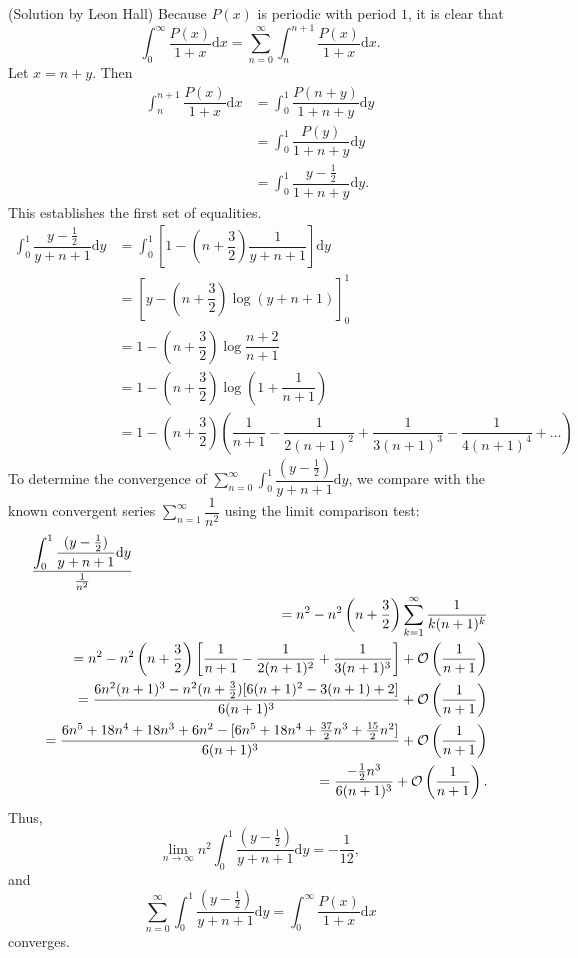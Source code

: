 \begin{solution}
(Solution by Leon Hall)
Because $P(x)$ is periodic with period $1$, it is clear that
$$\displaystyle\int_0^{\infty} \dfrac{P(x)}{1+x} \mathrm{d}x = \displaystyle\sum_{n=0}^{\infty} \displaystyle\int_n^{n+1} \dfrac{P(x)}{1+x} \mathrm{d}x.$$
Let $x = n+y$. Then
$$\begin{array}{ll}
\displaystyle\int_n^{n+1} \dfrac{P(x)}{1+x} \mathrm{d}x &= \displaystyle\int_0^1 \dfrac{P(n+y)}{1+n+y} \mathrm{d}y \\
&= \displaystyle\int_0^1 \dfrac{P(y)}{1+n+y}\mathrm{d}y \\
&= \displaystyle\int_0^1 \dfrac{y - \frac{1}{2}}{1+n+y} \mathrm{d}y.
\end{array}$$
This establishes the first set of equalities. 
$$\begin{array}{ll}
\displaystyle\int_0^1 \dfrac{y - \frac{1}{2}}{y+n+1} \mathrm{d}y &= \displaystyle\int_0^1 \left[ 1 - \left( n + \dfrac{3}{2} \right) \dfrac{1}{y+n+1} \right] \mathrm{d}y \\
&= \left[ y - \left( n + \dfrac{3}{2} \right) \log(y+n+1) \right]_0^1 \\
&= 1 - \left( n + \dfrac{3}{2} \right) \log \dfrac{n+2}{n+1} \\
&= 1 - \left( n + \dfrac{3}{2} \right) \log \left( 1 + \dfrac{1}{n+1} \right) \\
&= 1\!-\!\left(\!n\!+\!\dfrac{3}{2}\!\right)\!\left(\!\dfrac{1}{n+1}\!-\!\dfrac{1}{2(n+1)^2}\!+\!\dfrac{1}{3(n+1)^3}\!-\!\dfrac{1}{4(n+1)^4}\!+\!\ldots\!\right)%
\end{array}$$
To determine the convergence of $\displaystyle\sum_{n=0}^{\infty} \displaystyle\int_0^1 \dfrac{(y - \frac{1}{2})}{y+n+1} \mathrm{d}y$, we compare with the known convergent series $\displaystyle\sum_{n=1}^{\infty} \dfrac{1}{n^2}$ using the limit comparison test:
\begin{eqnarray*}
\lefteqn{\dfrac{\displaystyle\int_0^1 \dfrac{(y - \frac{1}{2})}{y+n+1} \mathrm{d}y}{\frac{1}{n^2}}} \\
& &= n^2 - n^2 \left( n + \dfrac{3}{2} \right) \displaystyle\sum_{k=1}^{\infty} \dfrac{1}{k(n+1)^k} \\
& &= n^2 - n^2 \left( n + \dfrac{3}{2} \right) \left[ \dfrac{1}{n+1} - \dfrac{1}{2(n+1)^2} + \dfrac{1}{3(n+1)^3} \right] + \mathcal{O} \left( \dfrac{1}{n+1} \right) \\
& &= \dfrac{6n^2(n+1)^3 - n^2 ( n + \frac{3}{2}) [6(n+1)^2 - 3(n+1)+2]}{6(n+1)^3} + \mathcal{O} \left( \dfrac{1}{n+1} \right) \\
& &= \dfrac{6n^5 + 18n^4 + 18n^3 + 6n^2 - [6n^5 + 18n^4 + \frac{37}{2} n^3 + \frac{15}{2} n^2]}{6(n+1)^3} + \mathcal{O} \left( \dfrac{1}{n+1} \right) \\
& &= \dfrac{-\frac{1}{2} n^3}{6(n+1)^3} + \mathcal{O} \left( \dfrac{1}{n+1} \right).
\end{eqnarray*}
Thus,
$$\displaystyle\lim_{n \rightarrow \infty} n^2 \displaystyle\int_0^1 \dfrac{(y - \frac{1}{2})}{y+n+1} \mathrm{d}y = -\dfrac{1}{12},$$
and
$$\displaystyle\sum_{n=0}^{\infty} \displaystyle\int_0^1 \dfrac{(y-\frac{1}{2})}{y+n+1} \mathrm{d}y = \displaystyle\int_0^{\infty} \dfrac{P(x)}{1+x} \mathrm{d}x$$
converges.
\end{solution}
